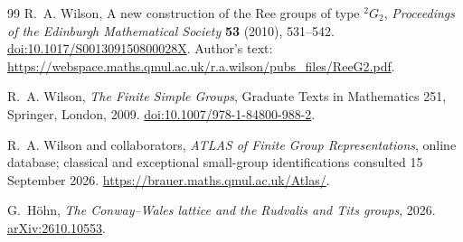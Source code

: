 \documentclass[11pt]{article}
\numberwithin{equation}{section}
\theoremstyle{definition}
\begin{document}
\begin{thebibliography}{99}
R.~A. Wilson, A new construction of the Ree groups of type ${}^2G_2$,
\emph{Proceedings of the Edinburgh Mathematical Society}
\textbf{53} (2010), 531--542.
\href{https://doi.org/10.1017/S001309150800028X}{doi:10.1017/S001309150800028X}.
Author's text:
\url{https://webspace.maths.qmul.ac.uk/r.a.wilson/pubs_files/ReeG2.pdf}.

R.~A. Wilson,
\emph{The Finite Simple Groups}, Graduate Texts in Mathematics 251,
Springer, London, 2009.
\href{https://doi.org/10.1007/978-1-84800-988-2}{doi:10.1007/978-1-84800-988-2}.

R.~A. Wilson and collaborators,
\emph{ATLAS of Finite Group Representations}, online database;
classical and exceptional small-group identifications consulted
15 September 2026.
\url{https://brauer.maths.qmul.ac.uk/Atlas/}.

G.~H\"ohn, \emph{The Conway--Wales lattice and the Rudvalis and Tits groups}, 2026.
\href{https://arxiv.org/abs/2610.10553}{arXiv:2610.10553}.

\end{thebibliography}
\endgroup
\end{document}
